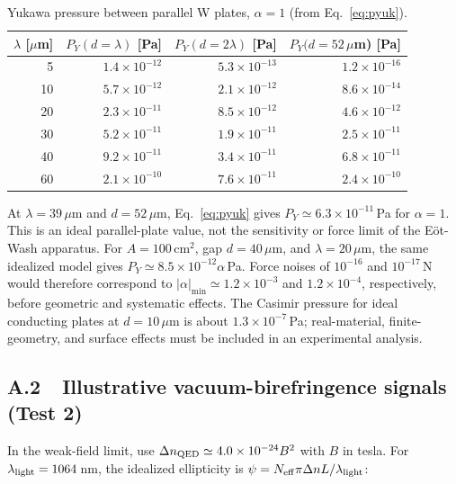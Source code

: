 \documentclass[11pt,a4paper]{article}
\begin{document}
\begin{table}[htbp]
\centering\small
\caption{Yukawa pressure between parallel W plates, $\alpha=1$ (from Eq.~\eqref{eq:pyuk}).}
\begin{tabular}{@{}rrrr@{}}
\toprule
$\lambda$ [$\mu$m] & $P_Y(d=\lambda)$ [Pa] & $P_Y(d=2\lambda)$ [Pa] & $P_Y(d=52\,\mu$m) [Pa]\\
\midrule
5  & $1.4\times10^{-12}$ & $5.3\times10^{-13}$ & $1.2\times10^{-16}$ \\
10 & $5.7\times10^{-12}$ & $2.1\times10^{-12}$ & $8.6\times10^{-14}$ \\
20 & $2.3\times10^{-11}$ & $8.5\times10^{-12}$ & $4.6\times10^{-12}$ \\
30 & $5.2\times10^{-11}$ & $1.9\times10^{-11}$ & $2.5\times10^{-11}$ \\
40 & $9.2\times10^{-11}$ & $3.4\times10^{-11}$ & $6.8\times10^{-11}$ \\
60 & $2.1\times10^{-10}$ & $7.6\times10^{-11}$ & $2.4\times10^{-10}$ \\
\bottomrule
\end{tabular}
\end{table}

\noindent
At $\lambda=39\,\mu$m and $d=52\,\mu$m, Eq.~\eqref{eq:pyuk} gives
$P_Y\simeq6.3\times10^{-11}\,$Pa for $\alpha=1$. This is an ideal parallel-plate value, not the
sensitivity or force limit of the E\"ot-Wash apparatus. For $A=100\,$cm$^2$, gap
$d=40\,\mu$m, and $\lambda=20\,\mu$m, the same idealized model gives
$P_Y\simeq8.5\times10^{-12}\alpha\,$Pa. Force noises of $10^{-16}$ and $10^{-17}\,$N would
therefore correspond to $|\alpha|_{\min}\simeq1.2\times10^{-3}$ and
$1.2\times10^{-4}$, respectively, before geometric and systematic effects. The Casimir pressure
for ideal conducting plates at $d=10\,\mu$m is about $1.3\times10^{-7}\,$Pa; real-material,
finite-geometry, and surface effects must be included in an experimental analysis.

\subsection*{A.2\ \ Illustrative vacuum-birefringence signals (Test 2)}

In the weak-field limit, use $\Delta n_{\rm QED}\simeq4.0\times10^{-24}B^2$ with $B$ in tesla.
For $\lambda_{\rm light}=1064\,$nm, the idealized ellipticity is
$\psi=N_{\rm eff}\pi\Delta n L/\lambda_{\rm light}$:
\end{document}
